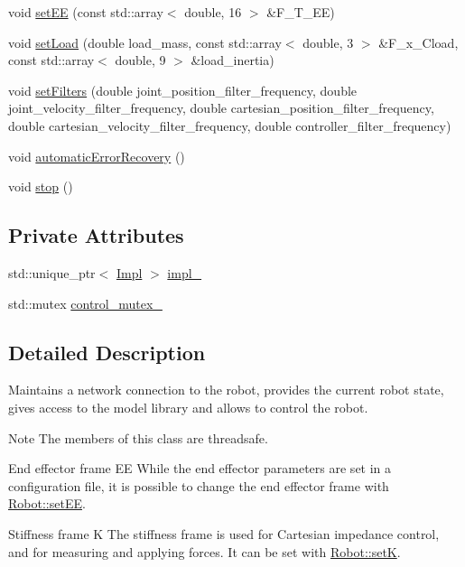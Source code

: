 \begin{Indent}
\begin{DoxyCompactItemize}
\item 
void \hyperlink{classfranka_1_1Robot_a5043fca4c35f63b492d9e67c74ddc73b}{set\+EE} (const std\+::array$<$ double, 16 $>$ \&F\+\_\+\+T\+\_\+\+EE)
\item 
void \hyperlink{classfranka_1_1Robot_afcb708df10f24563dbcf7d5b907b4a15}{set\+Load} (double load\+\_\+mass, const std\+::array$<$ double, 3 $>$ \&F\+\_\+x\+\_\+\+Cload, const std\+::array$<$ double, 9 $>$ \&load\+\_\+inertia)
\item 
void \hyperlink{classfranka_1_1Robot_aebce1a0dbe3b139bb24001845b2afe07}{set\+Filters} (double joint\+\_\+position\+\_\+filter\+\_\+frequency, double joint\+\_\+velocity\+\_\+filter\+\_\+frequency, double cartesian\+\_\+position\+\_\+filter\+\_\+frequency, double cartesian\+\_\+velocity\+\_\+filter\+\_\+frequency, double controller\+\_\+filter\+\_\+frequency)
\item 
void \hyperlink{classfranka_1_1Robot_af682aa673415718715bd859116bc2fed}{automatic\+Error\+Recovery} ()
\item 
void \hyperlink{classfranka_1_1Robot_a69cb08e075a81ecf3f26e94d26a06296}{stop} ()
\end{DoxyCompactItemize}
\end{Indent}
\subsection*{Private Attributes}
\begin{DoxyCompactItemize}
\item 
std\+::unique\+\_\+ptr$<$ \hyperlink{classfranka_1_1Robot_1_1Impl}{Impl} $>$ \hyperlink{classfranka_1_1Robot_aca155054184e5b6478942fd6a1b82ba4}{impl\+\_\+}
\item 
std\+::mutex \hyperlink{classfranka_1_1Robot_a719ad1fab76f8edfc9f6f761671c1375}{control\+\_\+mutex\+\_\+}
\end{DoxyCompactItemize}


\subsection{Detailed Description}
Maintains a network connection to the robot, provides the current robot state, gives access to the model library and allows to control the robot.

\begin{DoxyNote}{Note}
The members of this class are threadsafe.
\end{DoxyNote}
\begin{DoxyParagraph}{End effector frame EE}
While the end effector parameters are set in a configuration file, it is possible to change the end effector frame with \hyperlink{classfranka_1_1Robot_a5043fca4c35f63b492d9e67c74ddc73b}{Robot\+::set\+EE}.
\end{DoxyParagraph}
\label{classfranka_1_1Robot_k-frame}%
%
\begin{DoxyParagraph}{Stiffness frame K}
The stiffness frame is used for Cartesian impedance control, and for measuring and applying forces. It can be set with \hyperlink{classfranka_1_1Robot_ad1cf59d1b11306d80cd3c7144a989c56}{Robot\+::setK}. 
\end{DoxyParagraph}


